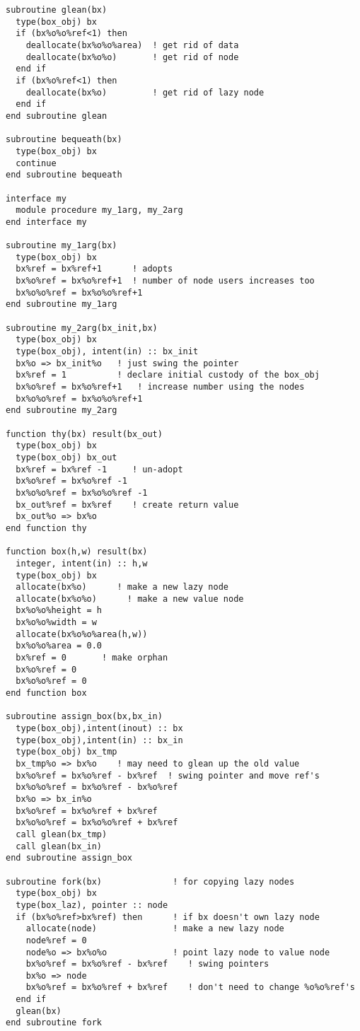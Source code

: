 \begin{verbatim}
subroutine glean(bx)
  type(box_obj) bx
  if (bx%o%o%ref<1) then
    deallocate(bx%o%o%area)  ! get rid of data
    deallocate(bx%o%o)       ! get rid of node
  end if
  if (bx%o%ref<1) then
    deallocate(bx%o)         ! get rid of lazy node
  end if
end subroutine glean

subroutine bequeath(bx)
  type(box_obj) bx
  continue
end subroutine bequeath

interface my
  module procedure my_1arg, my_2arg
end interface my

subroutine my_1arg(bx)
  type(box_obj) bx
  bx%ref = bx%ref+1      ! adopts
  bx%o%ref = bx%o%ref+1  ! number of node users increases too
  bx%o%o%ref = bx%o%o%ref+1
end subroutine my_1arg

subroutine my_2arg(bx_init,bx)
  type(box_obj) bx
  type(box_obj), intent(in) :: bx_init
  bx%o => bx_init%o   ! just swing the pointer
  bx%ref = 1          ! declare initial custody of the box_obj
  bx%o%ref = bx%o%ref+1   ! increase number using the nodes
  bx%o%o%ref = bx%o%o%ref+1
end subroutine my_2arg

function thy(bx) result(bx_out)
  type(box_obj) bx
  type(box_obj) bx_out
  bx%ref = bx%ref -1     ! un-adopt
  bx%o%ref = bx%o%ref -1 
  bx%o%o%ref = bx%o%o%ref -1 
  bx_out%ref = bx%ref    ! create return value
  bx_out%o => bx%o
end function thy

function box(h,w) result(bx)
  integer, intent(in) :: h,w
  type(box_obj) bx
  allocate(bx%o)      ! make a new lazy node
  allocate(bx%o%o)      ! make a new value node
  bx%o%o%height = h
  bx%o%o%width = w
  allocate(bx%o%o%area(h,w))
  bx%o%o%area = 0.0
  bx%ref = 0       ! make orphan
  bx%o%ref = 0
  bx%o%o%ref = 0
end function box

subroutine assign_box(bx,bx_in)
  type(box_obj),intent(inout) :: bx
  type(box_obj),intent(in) :: bx_in
  type(box_obj) bx_tmp
  bx_tmp%o => bx%o    ! may need to glean up the old value
  bx%o%ref = bx%o%ref - bx%ref  ! swing pointer and move ref's
  bx%o%o%ref = bx%o%ref - bx%o%ref
  bx%o => bx_in%o
  bx%o%ref = bx%o%ref + bx%ref
  bx%o%o%ref = bx%o%o%ref + bx%ref
  call glean(bx_tmp) 
  call glean(bx_in)
end subroutine assign_box

subroutine fork(bx)              ! for copying lazy nodes
  type(box_obj) bx
  type(box_laz), pointer :: node
  if (bx%o%ref>bx%ref) then      ! if bx doesn't own lazy node
    allocate(node)               ! make a new lazy node
    node%ref = 0
    node%o => bx%o%o             ! point lazy node to value node
    bx%o%ref = bx%o%ref - bx%ref    ! swing pointers
    bx%o => node
    bx%o%ref = bx%o%ref + bx%ref    ! don't need to change %o%o%ref's
  end if
  glean(bx)
end subroutine fork


\end{verbatim}
